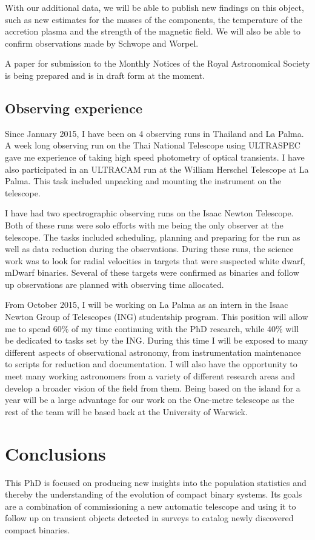 \documentclass[a4paper,fleqn,usenatbib]{mnras}
\begin{document}
With our additional data, we will be able to publish new findings on this object, such as new estimates for the masses of the components, the temperature of the accretion plasma and the strength of the magnetic field. We will also be able to confirm observations made by Schwope and Worpel. 

A paper for submission to the Monthly Notices of the Royal Astronomical Society is being prepared and is in draft form at the moment. 

\subsection{Observing experience}
Since January 2015, I have been on 4 observing runs in Thailand and La Palma. A week long observing run on the Thai National Telescope using ULTRASPEC gave me experience of taking high speed photometry of optical transients. I have also participated in an ULTRACAM run at the William Herschel Telescope at La Palma. This task included unpacking and mounting the instrument on the telescope. 

I have had two spectrographic observing runs on the Isaac Newton Telescope. Both of these runs were solo efforts with me being the only observer at the telescope. The tasks included scheduling, planning and preparing for the run as well as data reduction during the observations. During these runs, the science work was to look for radial velocities in targets that were suspected white dwarf, mDwarf binaries. Several of these targets were confirmed as binaries and follow up observations are planned with observing time allocated.  

From October 2015, I will be working on La Palma as an intern in the Isaac Newton Group of Telescopes (ING) studentship program. This position will allow me to spend 60\% of my time continuing with the PhD research, while 40\% will be dedicated to tasks set by the ING. During this time I will be exposed to many different aspects of observational astronomy, from instrumentation maintenance to scripts for reduction and documentation. I will also have the opportunity to meet many working astronomers from a variety of different research areas and develop a broader vision of the field from them.  Being based on the island for a year will be a large advantage for our work on the One-metre telescope as the rest of the team will be based back at the University of Warwick.  

\section{Conclusions}
This PhD is focused on producing new insights into the population statistics and thereby the understanding of the evolution of compact binary systems. Its goals are a combination of commissioning a new automatic telescope and using it to follow up on transient objects detected in surveys to catalog newly discovered compact binaries. 
\end{document}

